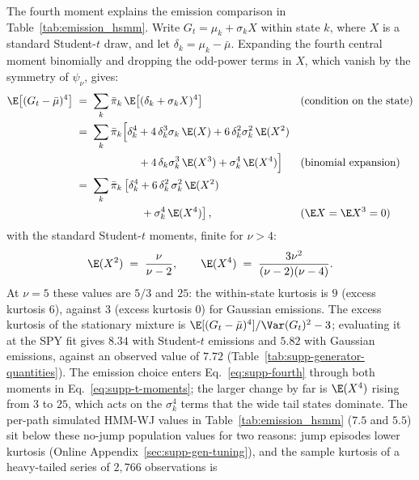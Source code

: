 The fourth moment explains the emission comparison in
Table~\ref{tab:emission_hsmm}. Write $G_t = \mu_k +
\sigma_k X$ within state $k$, where $X$ is a standard Student-$t$
draw, and let $\delta_k = \mu_k - \bar\mu$. Expanding the fourth
central moment binomially and dropping the odd-power terms in $X$,
which vanish by the symmetry of $\psi_\nu$, gives:
\begin{align}
  \E\big[(G_t - \bar\mu)^4\big]
   &\;=\; \sum_k \bar\pi_k\,
     \E\big[(\delta_k + \sigma_k X)^4\big]
     && \text{(condition on the state)} \notag \\
   &\;=\; \sum_k \bar\pi_k \Big[
     \delta_k^4 + 4\, \delta_k^3 \sigma_k\, \E(X)
     + 6\, \delta_k^2 \sigma_k^2\, \E(X^2) \notag \\
   &\hspace{6em}
     + 4\, \delta_k \sigma_k^3\, \E(X^3) + \sigma_k^4\, \E(X^4)\Big]
     && \text{(binomial expansion)} \notag \\
   &\;=\; \sum_k \bar\pi_k \left[
     \delta_k^4
     + 6\, \delta_k^2\, \sigma_k^2\, \E(X^2)\right. \notag \\
   &\hspace{6em}\left.{}
     + \sigma_k^4\, \E(X^4)
     \right],
     && \text{($\E X = \E X^3 = 0$)}
  \label{eq:supp-fourth}
\end{align}
with the standard Student-$t$ moments, finite for $\nu > 4$:
\begin{equation}
  \E(X^2) \;=\; \frac{\nu}{\nu - 2},
  \qquad
  \E(X^4) \;=\; \frac{3 \nu^2}{(\nu - 2)(\nu - 4)}.
  \label{eq:supp-t-moments}
\end{equation}
At $\nu = 5$ these values are $5/3$ and $25$: the within-state
kurtosis is $9$ (excess kurtosis $6$), against $3$ (excess kurtosis
$0$) for Gaussian emissions. The excess kurtosis of the stationary mixture is
$\E[(G_t - \bar\mu)^4] / \Var(G_t)^2 - 3$; evaluating it at the SPY
fit gives $8.34$ with Student-$t$ emissions and $5.82$ with Gaussian
emissions, against an observed value of $7.72$
(Table~\ref{tab:supp-generator-quantities}). The emission choice enters
Eq.~\eqref{eq:supp-fourth} through both moments in
Eq.~\eqref{eq:supp-t-moments}; the larger change by far is
$\E(X^4)$ rising from $3$ to $25$, which acts on the $\sigma_k^4$
terms that the wide tail states dominate. The per-path simulated
HMM-WJ values in Table~\ref{tab:emission_hsmm} ($7.5$ and $5.5$) sit
below these no-jump population values for two reasons: jump episodes
lower kurtosis (Online Appendix~\ref{sec:supp-gen-tuning}), and the
sample kurtosis of a heavy-tailed series of $2{,}766$ observations is
